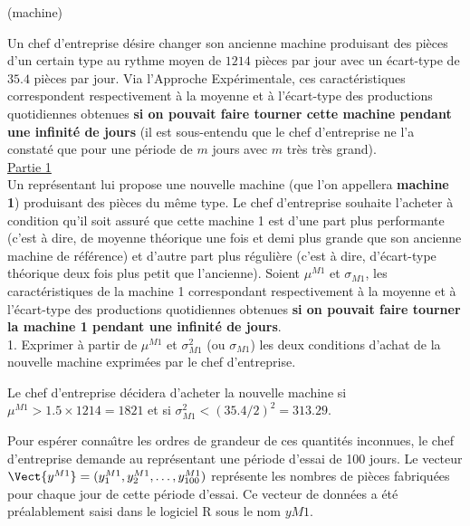 \documentclass[10pt]{report}
\begin{document}
\begin{exercice} (machine)

Un chef d'entreprise d{\'e}sire changer son ancienne machine produisant des pi{\`e}ces d'un certain type au rythme moyen de $1214$ pi{\`e}ces par jour avec un {\'e}cart-type de $35.4$ pi{\`e}ces par jour. Via l'Approche Exp{\'e}rimentale, ces caract{\'e}ristiques correspondent respectivement {\`a} la moyenne et {\`a} l'{\'e}cart-type des productions quotidiennes obtenues \textbf{si on pouvait faire tourner cette machine pendant une infinit{\'e} de jours} (il est sous-entendu que le chef d'entreprise ne l'a constat{\'e} que pour une p{\'e}riode de $m$ jours avec $m$ tr{\`e}s tr{\`e}s grand).\\

\noindent \underline{Partie 1} \\

Un repr{\'e}sentant lui propose une nouvelle machine (que l'on appellera \textbf{machine 1}) produisant des pi{\`e}ces du m{\^e}me type. Le chef d'entreprise souhaite l'acheter {\`a} condition qu'il soit assur{\'e} que cette machine 1 est d'une part plus performante (c'est {\`a} dire, de moyenne th{\'e}orique une fois et demi plus grande que son ancienne machine de r{\'e}f{\'e}rence) et d'autre part plus r{\'e}guli{\`e}re (c'est {\`a} dire, d'{\'e}cart-type th{\'e}orique deux fois plus petit que l'ancienne). Soient $\mu^{M1}$ et $\sigma_{M1}$, les caract{\'e}ristiques de la machine 1 correspondant respectivement {\`a} la moyenne et {\`a} l'{\'e}cart-type des productions quotidiennes obtenues \textbf{si on pouvait faire tourner la machine 1 pendant une infinit{\'e} de jours}.\\

1. Exprimer {\`a} partir de $\mu^{M1}$ et $\sigma^2_{M1}$ (ou $\sigma_{M1}$) les deux conditions d'achat de la nouvelle machine exprim{\'e}es par le chef d'entreprise.\\


\begin{Correction}
Le chef d'entreprise décidera d'acheter la nouvelle machine si $\mu^{M1}>1.5\times 1214=1821$ et si $\sigma_{M1}^2 < (35.4/2)^2=313.29$.
\end{Correction}


Pour esp{\'e}rer conna{\^\i}tre les ordres de grandeur de ces quantit{\'e}s inconnues, le chef d'entreprise demande au repr{\'e}sentant une p{\'e}riode d'essai de 100 jours. Le vecteur $\Vect{y^{M1}}=(y_1^{M1},y_2^{M1},\ldots,y_{100}^{M1})$ repr{\'e}sente les nombres de pi{\`e}ces fabriqu{\'e}es pour chaque jour de cette p{\'e}riode d'essai. Ce vecteur de donn{\'e}es a {\'e}t{\'e} pr{\'e}alablement saisi dans le logiciel R sous le nom $yM1$. \\


\end{exercice}
\end{document}
